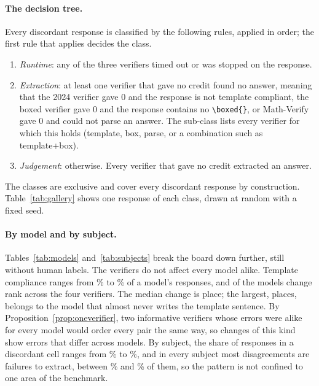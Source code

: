 \paragraph{The decision tree.}
Every discordant response is classified by the following rules, applied in order; the first rule
that applies decides the class.
\begin{enumerate}
\item \emph{Runtime}: any of the three verifiers timed out or was stopped on the response.
\item \emph{Extraction}: at least one verifier that gave no credit found no answer, meaning that
  the 2024 verifier gave $0$ and the response is not template compliant, the boxed verifier gave
  $0$ and the response contains no \texttt{\textbackslash boxed\{\}}, or Math-Verify gave $0$ and
  could not parse an answer. The sub-class lists every verifier for which this holds (template,
  box, parse, or a combination such as template+box).
\item \emph{Judgement}: otherwise. Every verifier that gave no credit extracted an answer.
\end{enumerate}
The classes are exclusive and cover every discordant response by construction.
Table~\ref{tab:gallery} shows one response of each class, drawn at random with a fixed seed.



\paragraph{By model and by subject.}
Tables~\ref{tab:models} and~\ref{tab:subjects} break the board down further, still without human
labels. The verifiers do not affect every model alike. Template compliance ranges from
\TemplateMinPct\% to \TemplateMaxPct\% of a model's responses, and \RankChangeModels{} of the
\NumModels{} models change rank across the four verifiers. The median change is
\RankSpreadMedian{} place; the largest, \RankSpreadMax{} places, belongs to the model that almost
never writes the template sentence. By Proposition~\ref{prop:oneverifier}, two informative
verifiers whose errors were alike for every model would order every pair the same way, so changes of this kind
show errors that differ across models. By subject, the share of responses in a discordant cell
ranges from \DiscSubjectMinPct\% to \DiscSubjectMaxPct\%, and in every subject most disagreements
are failures to extract, between \ExtrSubjectMinPct\% and \ExtrSubjectMaxPct\% of them, so the
pattern is not confined to one area of the benchmark.

